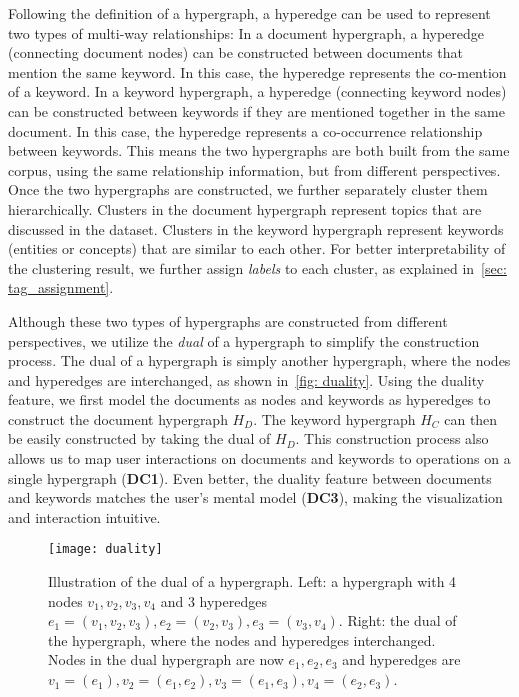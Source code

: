 Following the definition of a hypergraph, a hyperedge can be used to represent two types of multi-way relationships:
In a document hypergraph, a hyperedge (connecting document nodes) can be constructed between documents that mention the same keyword. 
In this case, the hyperedge represents the co-mention of a keyword.
In a keyword hypergraph, a hyperedge (connecting keyword nodes) can be constructed between keywords if they are mentioned together in the same document.
In this case, the hyperedge represents a co-occurrence relationship between keywords.
This means the two hypergraphs are both built from the same corpus, using the same relationship information, but from different perspectives.
Once the two hypergraphs are constructed, we further separately cluster them hierarchically.
Clusters in the document hypergraph represent topics that are discussed in the dataset.
Clusters in the keyword hypergraph represent keywords (entities or concepts) that are similar to each other.
For better interpretability of the clustering result, we further assign \textit{labels} to each cluster, as explained in~\autoref{sec: tag_assignment}.

Although these two types of hypergraphs are constructed from different perspectives, we utilize the \textit{dual} of a hypergraph to simplify the construction process.
The dual of a hypergraph is simply another hypergraph, where the nodes and hyperedges are interchanged, as shown in~\autoref{fig: duality}.
Using the duality feature, we first model the documents as nodes and keywords as hyperedges to construct the document hypergraph $H_D$.
The keyword hypergraph $H_C$ can then be easily constructed by taking the dual of $H_D$.
This construction process also allows us to map user interactions on documents and keywords to operations on a single hypergraph (\textbf{DC1}).
Even better, the duality feature between documents and keywords matches the user's mental model (\textbf{DC3}), making the visualization and interaction intuitive.

\begin{figure}
 \centering %
 \texttt{[image: duality]}
 \caption{Illustration of the dual of a hypergraph. 
 Left: a hypergraph with 4 nodes $v_1, v_2, v_3, v_4$ and 3 hyperedges $e_1=(v_1, v_2, v_3), e_2=(v_2, v_3), e_3=(v_3, v_4)$. 
 Right: the dual of the hypergraph, where the nodes and hyperedges interchanged.
 Nodes in the dual hypergraph are now $e_1, e_2, e_3$ and hyperedges are $v_1=(e_1), v_2=(e_1, e_2), v_3=(e_1, e_3), v_4=(e_2, e_3)$.
 }

\label{fig: duality}
\end{figure}

